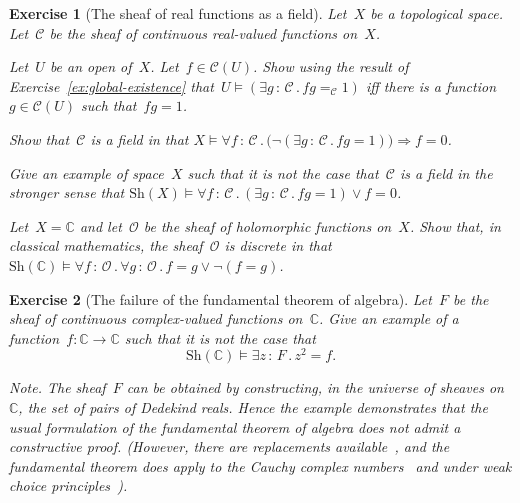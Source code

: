 \documentclass{ws-rv9x6}
\newtheorem{ex}{Exercise}
\newenvironment{exercise}[1]{
  \begin{ex}[#1]
}{\end{ex}}
\newcommand{\C}{\mathcal{C}}
\renewcommand{\O}{\mathcal{O}}
\newcommand{\CC}{\mathbb{C}}
\newcommand{\Sh}{\mathrm{Sh}}
\renewcommand{\_}{\mathpunct{.}}
\newcommand{\?}{\,{:}\,}
\begin{document}
\begin{exercise}{The sheaf of real functions as a field}%
Let~$X$ be a topological space. Let~$\C$ be the sheaf of continuous real-valued
functions on~$X$.
\begin{alphlist}[(d)]
\item Let~$U$ be an open of~$X$. Let~$f \in \C(U)$. Show using the result
of Exercise~\ref{ex:global-existence} that~$U \models (\exists g\?\C\_ fg =_\C
1)$ iff there is a function~$g \in \C(U)$ such that~$fg = 1$.
\item Show that~$\C$ is a field in that
$X \models \forall f\?\C\_
  \bigl(\neg(\exists g\?\C\_ fg = 1)\bigr) \Rightarrow f = 0$.
\item Give an example of space~$X$ such that it is not the case that~$\C$ is a
field in the stronger sense that
$\Sh(X) \models \forall f\?\C\_ (\exists g\?\C\_ fg = 1) \vee f = 0$.
\item Let~$X = \CC$ and let~$\O$ be the sheaf of holomorphic functions on~$X$.
Show that, in classical mathematics, the sheaf~$\O$ is \emph{discrete} in that
$\Sh(\CC) \models \forall f\?\O\_ \forall g\?\O\_ f = g \vee \neg(f = g)$.
\end{alphlist}
\end{exercise}

\begin{exercise}{The failure of the fundamental theorem of algebra}%
\label{ex:fta}%
Let~$F$ be the sheaf of continuous complex-valued functions on~$\CC$. Give an
example of a function~$f : \CC \to \CC$ such that it is not the case that
\[ \Sh(\CC) \models \exists z\?F\_ z^2 = f. \]
{\scriptsize\emph{Note.} The sheaf~$F$ can be obtained by constructing, in the
universe of sheaves on~$\CC$, the set of pairs of Dedekind reals. Hence the
example demonstrates that the usual formulation of the fundamental theorem of
algebra does not admit a constructive proof. (However, there are replacements
available~\cite{richman:fta}, and the fundamental theorem does apply to the
Cauchy complex numbers~\cite{ruitenburg:roots} and under weak choice
principles~\cite{bridges-richman-schuster:wcc}).\par}
\end{exercise}
\end{document}
